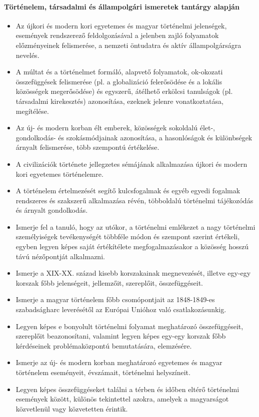 \paragraph{Történelem, társadalmi és állampolgári ismeretek tantárgy alapján}
\begin{itemize}
\item Az újkori és modern kori egyetemes és magyar történelmi jelenségek, események rendszerező feldolgozásával a jelenben zajló folyamatok előzményeinek felismerése, a nemzeti öntudatra és aktív állampolgárságra nevelés.
\item A múltat és a történelmet formáló, alapvető folyamatok, ok-okozati összefüggések felismerése (pl. a globalizáció felerősödése és a lokális közösségek megerősödése) és egyszerű, átélhető erkölcsi tanulságok (pl. társadalmi kirekesztés) azonosítása, ezeknek jelenre vonatkoztatása, megítélése.
\item Az új- és modern korban élt emberek, közösségek sokoldalú élet-, gondolkodás- és szokásmódjainak azonosítása, a hasonlóságok és különbségek árnyalt felismerése, több szempontú értékelése.
\item A civilizációk története jellegzetes sémájának alkalmazása újkori és modern kori egyetemes történelemre.
\item A történelem értelmezését segítő kulcsfogalmak és egyéb egyedi fogalmak rendszeres és szakszerű alkalmazása révén, többoldalú történelmi tájékozódás és árnyalt gondolkodás.
\item Ismerje fel a tanuló, hogy az utókor, a történelmi emlékezet a nagy történelmi személyiségek tevékenységét többféle módon és szempont szerint értékeli, egyben legyen képes saját értékítélete megfogalmazásakor a közösség hosszú távú nézőpontját alkalmazni.
\item Ismerje a XIX-XX. század kisebb korszakainak megnevezését, illetve egy-egy korszak főbb jelenségeit, jellemzőit, szereplőit, összefüggéseit.
\item Ismerje a magyar történelem főbb csomópontjait az 1848-1849-es szabadságharc leverésétől az Európai Unióhoz való csatlakozásunkig.
\item Legyen képes e bonyolult történelmi folyamat meghatározó összefüggéseit, szereplőit beazonosítani, valamint legyen képes egy-egy korszak főbb kérdéseinek problémaközpontú bemutatására, elemzésére.
\item Ismerje az új- és modern korban meghatározó egyetemes és magyar történelem eseményeit, évszámait, történelmi helyszíneit.
\item Legyen képes összefüggéseket találni a térben és időben eltérő történelmi események között, különös tekintettel azokra, amelyek a magyarságot közvetlenül vagy közvetetten érintik.

\end{itemize}
